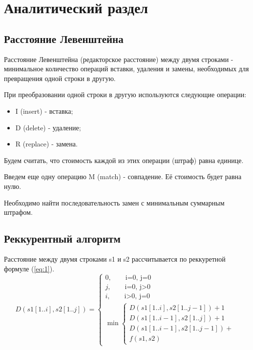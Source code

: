 \chapter{Аналитический раздел}

\section{Расстояние Левенштейна}
Расстояние Левенштейна (редакторское расстояние) между двумя строками - минимальное количество операций вставки, удаления и замены, необходимых для превращения одной строки в другую.

При преобразовании одной строки в другую используются следующие операции:

\begin{itemize}
	\item I (insert) - вставка;
	\item D (delete) - удаление;
	\item R (replace) - замена.
\end{itemize}
Будем считать, что стоимость каждой из этих операции (штраф) равна единице.

Введем еще одну операцию M (match) - совпадение. Её стоимость будет равна нулю.

Необходимо найти последовательность замен с минимальным суммарным штрафом.

\section{Реккурентный алгоритм}
Расстояние между двумя строками s1 и s2 рассчитывается по реккуретной формуле (\ref{eq:1}).
\begin{equation}
	D(s1[1..i], s2[1..j]) = 
	\begin{cases}
		0, \quad \phantom{\infty}\text{i=0, j=0}\\
		j, \quad \phantom{\infty}\text{i=0, j>0}\\
		i, \quad \phantom{\infty}\text{i>0, j=0}\\
		\min \begin{cases}
			D(s1[1..i], s2[1..j-1]) + 1\\
			D(s1[1..i-1], s2[1..j]) + 1\\
			D(s1[1..i-1], s2[1..j-1]) + \\f(s1, s2)
		\end{cases}
	\end{cases}
	\label{eq:1}
\end{equation}

